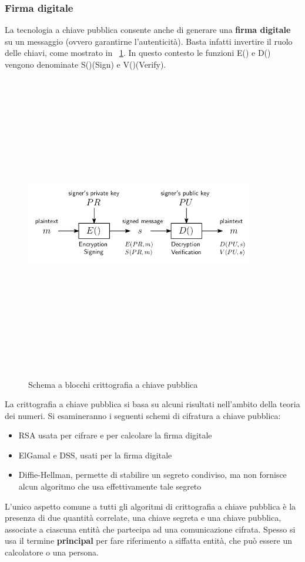 \subsubsection{Firma digitale}
La tecnologia a chiave pubblica consente anche di generare una \textbf{firma digitale} su un messaggio (ovvero garantirne l'autenticità). Basta infatti invertire il ruolo delle chiavi, come mostrato in \figurename~\ref{fig:pubblica_schema_firma}. In questo contesto le funzioni E() e D() vengono denominate S()(Sign) e V()(Verify). 
\begin{figure}[htbp]
	\centering%
	\subfigure%
	{\includegraphics[height=13cm, width=10cm, keepaspectratio]{Immagini/chiave_pubblica/chiave_pubblica_firma.png}}
	\caption{Schema a blocchi crittografia a chiave pubblica \label{fig:pubblica_schema_firma}} 	
\end{figure}

La crittografia a chiave pubblica si basa su alcuni risultati nell'ambito della teoria dei numeri. Si esamineranno i seguenti schemi di cifratura a chiave pubblica: 
\begin{itemize}
\item RSA usata per cifrare e per calcolare la firma digitale
\item ElGamal e DSS, usati per la firma digitale
\item Diffie-Hellman, permette di stabilire un segreto condiviso, ma non fornisce alcun algoritmo che usa effettivamente tale segreto
\end{itemize}
L'unico aspetto comune a tutti gli algoritmi di crittografia a chiave pubblica è la presenza di due quantità correlate, una chiave segreta e una chiave pubblica, associate a ciascuna entità che partecipa ad una comunicazione cifrata. Spesso si usa il termine \textbf{principal} per fare riferimento a siffatta entità, che può essere un calcolatore o una persona.

